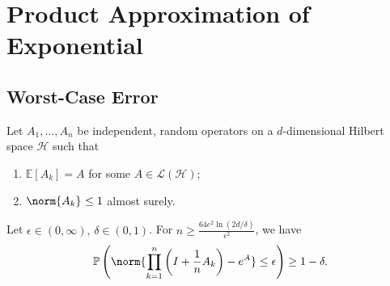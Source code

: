 \newpage

\section{Product Approximation of Exponential}

\subsection{Worst-Case Error}

\begin{thm}[]
  \label{worstcaseexp}
    Let \( A_1, \dots, A_n \) be independent, random operators on a \( d \)-dimensional Hilbert space \( \mathcal{H} \) such that 
    \begin{enumerate}[1)]
      \item \( \mathbb{E}\left[A_k\right] = A \) for some \( A \in \mathcal{L}(\mathcal{H}) \);
      \item \( \norm{A_k}_{} \leq  1 \) almost surely.
    \end{enumerate}
    Let \( \epsilon \in (0,\infty),\, \delta \in (0,1) \). For \( n \geq \frac{64e^{2} \operatorname{ln}(2d/\delta)}{\epsilon^{2}} \), we have 
  \[ \mathbb{P}\left(\norm{\prod_{k=1}^{n} \left(I+\frac{1}{n}A_k\right)-e^{A}}\leq\epsilon\right)  \geq 1-\delta.\]
\end{thm}


